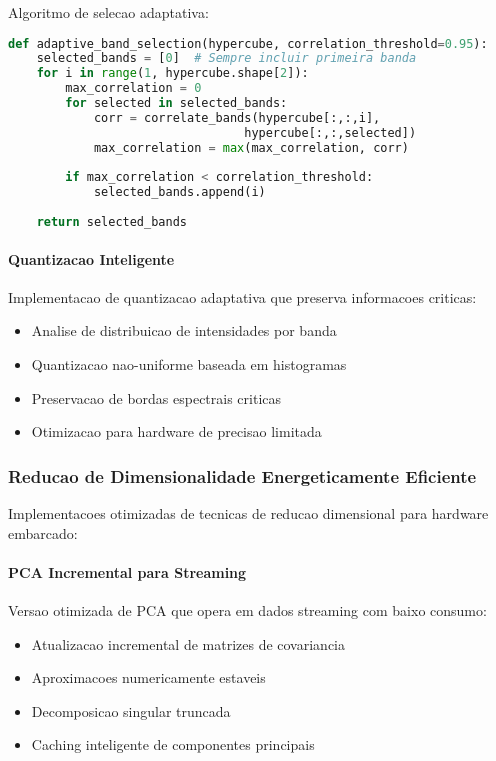 Algoritmo de selecao adaptativa:
\begin{lstlisting}[language=Python]
def adaptive_band_selection(hypercube, correlation_threshold=0.95):
    selected_bands = [0]  # Sempre incluir primeira banda
    for i in range(1, hypercube.shape[2]):
        max_correlation = 0
        for selected in selected_bands:
            corr = correlate_bands(hypercube[:,:,i], 
                                 hypercube[:,:,selected])
            max_correlation = max(max_correlation, corr)
        
        if max_correlation < correlation_threshold:
            selected_bands.append(i)
    
    return selected_bands
\end{lstlisting}

\paragraph{Quantizacao Inteligente}
Implementacao de quantizacao adaptativa que preserva informacoes criticas:
\begin{itemize}
    \item Analise de distribuicao de intensidades por banda
    \item Quantizacao nao-uniforme baseada em histogramas
    \item Preservacao de bordas espectrais criticas
    \item Otimizacao para hardware de precisao limitada
\end{itemize}

\subsubsection{Reducao de Dimensionalidade Energeticamente Eficiente}
Implementacoes otimizadas de tecnicas de reducao dimensional para hardware embarcado:

\paragraph{PCA Incremental para Streaming}
Versao otimizada de PCA que opera em dados streaming com baixo consumo:
\begin{itemize}
    \item Atualizacao incremental de matrizes de covariancia
    \item Aproximacoes numericamente estaveis
    \item Decomposicao singular truncada
    \item Caching inteligente de componentes principais
\end{itemize}


